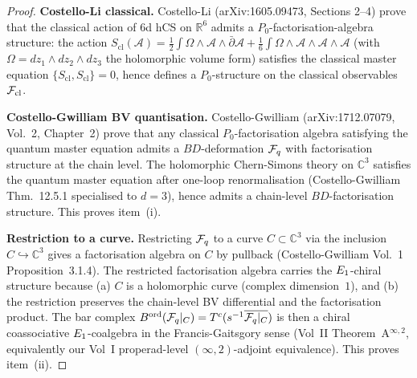 \begin{proof}
\textbf{Costello-Li classical.} Costello-Li (arXiv:1605.09473,
Sections 2--4) prove that the classical action of $6$d hCS on
$\mathbb{R}^6$ admits a $P_0$-factorisation-algebra structure: the action
$S_{\mathrm{cl}}(\mathcal{A}) = \tfrac{1}{2} \int \Omega \wedge
\mathcal{A} \wedge \bar\partial \mathcal{A}
+ \tfrac{1}{6} \int \Omega \wedge \mathcal{A} \wedge \mathcal{A} \wedge
\mathcal{A}$ (with $\Omega = dz_1 \wedge dz_2 \wedge dz_3$ the holomorphic
volume form) satisfies the classical master equation
$\{S_{\mathrm{cl}}, S_{\mathrm{cl}}\} = 0$, hence defines a $P_0$-structure
on the classical observables $\mathcal{F}_{\mathrm{cl}}$.

\textbf{Costello-Gwilliam BV quantisation.} Costello-Gwilliam
(arXiv:1712.07079, Vol.~2, Chapter~2) prove that any classical
$P_0$-factorisation algebra satisfying the quantum master equation admits a
$BD$-deformation $\mathcal{F}_{q}$ with factorisation structure at the chain level. The
holomorphic Chern-Simons theory on $\mathbb{C}^3$ satisfies the quantum
master equation after one-loop renormalisation (Costello-Gwilliam Thm.~12.5.1
specialised to $d = 3$), hence admits a chain-level $BD$-factorisation
structure. This proves item~(i).

\textbf{Restriction to a curve.} Restricting $\mathcal{F}_{q}$ to a curve
$C \subset \mathbb{C}^3$ via the inclusion $C \hookrightarrow \mathbb{C}^3$
gives a factorisation algebra on $C$ by pullback (Costello-Gwilliam Vol.~1
Proposition~3.1.4). The restricted factorisation algebra carries the
$E_{1}$-chiral structure because (a) $C$ is a holomorphic curve (complex
dimension~$1$), and (b) the restriction preserves the chain-level BV
differential and the factorisation product. The bar complex
$B^{\mathrm{ord}}(\mathcal{F}_{q}|_C) = T^c(s^{-1} \overline{\mathcal{F}_{q}|_C})$ is then a
chiral coassociative $E_{1}$-coalgebra in the Francis-Gaitsgory sense
(Vol~II Theorem~A$^{\infty,2}$, equivalently our Vol~I
\cite{VolI} properad-level
$(\infty,2)$-adjoint equivalence). This proves item~(ii).


\end{proof}

